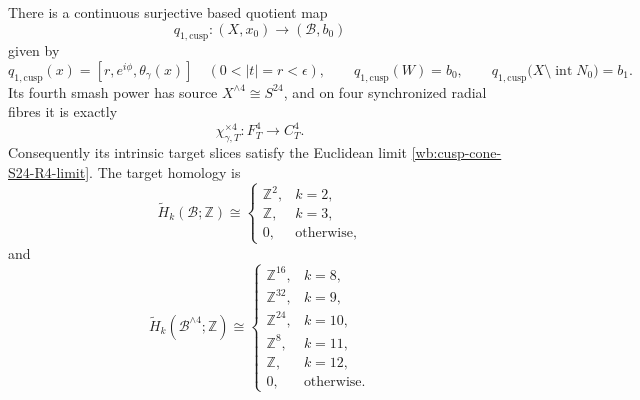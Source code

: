 \begin{proposition}
There is a continuous surjective based quotient map
\begin{equation}
 q_{1,\mathrm{cusp}}:(X,x_0)\longrightarrow(\mathcal B,b_0)
 \label{wb:cusp-cone-q1-local}
\end{equation}
given by
\begin{equation}
 q_{1,\mathrm{cusp}}(x)
 =[r,e^{i\phi},\theta_\gamma(x)]
 \quad(0<|t|=r<\epsilon),\qquad
 q_{1,\mathrm{cusp}}(W)=b_0,\qquad
 q_{1,\mathrm{cusp}}
 \bigl(X\setminus\operatorname{int}N_0\bigr)=b_1.
 \label{wb:cusp-cone-q1-local-formula}
\end{equation}
Its fourth smash power has source \(X^{\wedge4}\cong S^{24}\), and on
four synchronized radial fibres it is exactly
\begin{equation}
 \chi_{\gamma,T}^{\times4}:F_T^4\longrightarrow C_T^4.
 \label{wb:cusp-cone-S24-local-fibre-map}
\end{equation}
Consequently its intrinsic target slices satisfy the Euclidean limit
\cref{wb:cusp-cone-S24-R4-limit}.  The target homology is
\begin{equation}
 \widetilde H_k(\mathcal B;\mathbb Z)\cong
 \begin{cases}
  \mathbb Z^2,&k=2,\\
  \mathbb Z,&k=3,\\
  0,&\text{otherwise},
 \end{cases}
 \label{wb:cusp-cone-B-homology}
\end{equation}
and
\begin{equation}
 \widetilde H_k(\mathcal B^{\wedge4};\mathbb Z)\cong
 \begin{cases}
  \mathbb Z^{16},&k=8,\\
  \mathbb Z^{32},&k=9,\\
  \mathbb Z^{24},&k=10,\\
  \mathbb Z^8,&k=11,\\
  \mathbb Z,&k=12,\\
  0,&\text{otherwise}.
 \end{cases}
 \label{wb:cusp-cone-B-smash-homology}
\end{equation}
\end{proposition}



